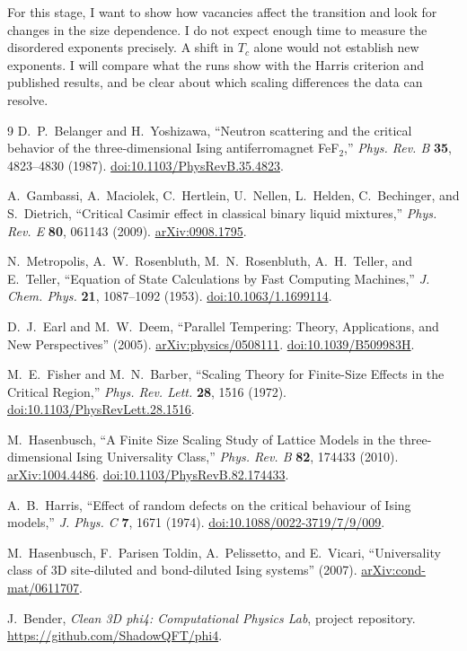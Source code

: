 \documentclass[11pt,letterpaper]{article}
\begin{document}
For this stage, I want to show how vacancies affect the transition and
look for changes in the size dependence. I do not expect enough time to
measure the disordered exponents precisely. A shift in $T_c$ alone would
not establish new exponents. I will compare what the runs show with the
Harris criterion and published results, and be clear about which scaling
differences the data can resolve.

\begin{thebibliography}{9}
\small
{}
D.~P.~Belanger and H.~Yoshizawa, ``Neutron scattering and the critical
behavior of the three-dimensional Ising antiferromagnet FeF$_2$,''
\emph{Phys. Rev. B} \textbf{35}, 4823--4830 (1987).
\href{https://doi.org/10.1103/PhysRevB.35.4823}{doi:10.1103/PhysRevB.35.4823}.

A.~Gambassi, A.~Maciolek, C.~Hertlein, U.~Nellen, L.~Helden,
C.~Bechinger, and S.~Dietrich, ``Critical Casimir effect in classical
binary liquid mixtures,'' \emph{Phys. Rev. E} \textbf{80}, 061143 (2009).
\href{https://arxiv.org/abs/0908.1795}{arXiv:0908.1795}.

N.~Metropolis, A.~W.~Rosenbluth, M.~N.~Rosenbluth, A.~H.~Teller, and
E.~Teller, ``Equation of State Calculations by Fast Computing Machines,''
\emph{J. Chem. Phys.} \textbf{21}, 1087--1092 (1953).
\href{https://doi.org/10.1063/1.1699114}{doi:10.1063/1.1699114}.

D.~J.~Earl and M.~W.~Deem, ``Parallel Tempering: Theory, Applications,
and New Perspectives'' (2005).
\href{https://arxiv.org/abs/physics/0508111}{arXiv:physics/0508111}.
\href{https://doi.org/10.1039/B509983H}{doi:10.1039/B509983H}.

M.~E.~Fisher and M.~N.~Barber, ``Scaling Theory for Finite-Size Effects
in the Critical Region,'' \emph{Phys. Rev. Lett.} \textbf{28}, 1516 (1972).
\href{https://doi.org/10.1103/PhysRevLett.28.1516}{doi:10.1103/PhysRevLett.28.1516}.

M.~Hasenbusch, ``A Finite Size Scaling Study of Lattice Models in the
three-dimensional Ising Universality Class,''
\emph{Phys. Rev. B} \textbf{82}, 174433 (2010).
\href{https://arxiv.org/abs/1004.4486}{arXiv:1004.4486}.
\href{https://doi.org/10.1103/PhysRevB.82.174433}{doi:10.1103/PhysRevB.82.174433}.

A.~B.~Harris, ``Effect of random defects on the critical behaviour of
Ising models,'' \emph{J. Phys. C} \textbf{7}, 1671 (1974).
\href{https://doi.org/10.1088/0022-3719/7/9/009}{doi:10.1088/0022-3719/7/9/009}.

M.~Hasenbusch, F.~Parisen Toldin, A.~Pelissetto, and E.~Vicari,
``Universality class of 3D site-diluted and bond-diluted Ising systems'' (2007).
\href{https://arxiv.org/abs/cond-mat/0611707}{arXiv:cond-mat/0611707}.

J.~Bender, \emph{Clean 3D phi4: Computational Physics Lab}, project repository.
\url{https://github.com/ShadowQFT/phi4}.
\end{thebibliography}
\end{document}
